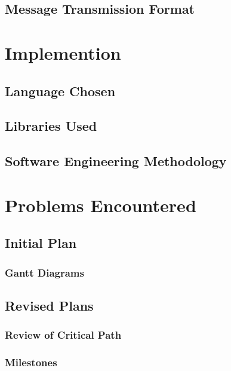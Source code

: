 \documentclass[a4paper,12pt]{report}
\begin{document}
\section{Message Transmission Format}




\chapter{Implemention}

\section{Language Chosen}



\section{Libraries Used}



\section{Software Engineering Methodology}




\chapter{Problems Encountered}

\section{Initial Plan}

\subsection{Gantt Diagrams}

\section{Revised Plans}

\subsection{Review of Critical Path}

\subsection{Milestones}
\end{document}
